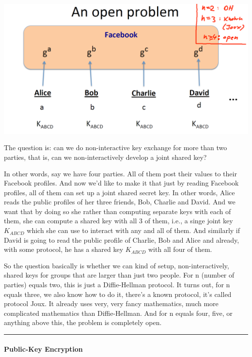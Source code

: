 \documentclass[11pt]{article}
\makeatletter
\def\maxwidth{\ifdim\Gin@nat@width>\linewidth\linewidth
    \else\Gin@nat@width\fi}
\let\Oldincludegraphics\includegraphics
\renewcommand{\includegraphics}[1]{\Oldincludegraphics[width=.8\maxwidth]{#1}}
\makeatother
\begin{document}
\includegraphics{./Images/DH-OpenProb.png}

The question is: can we do non-interactive key exchange for more than
two parties, that is, can we non-interactively develop a joint shared
key?

In other words, say we have four parties. All of them post their values
to their Facebook profiles. And now we'd like to make it that just by
reading Facebook profiles, all of them can set up a joint shared secret
key. In other words, Alice reads the public profiles of her three
friends, Bob, Charlie and David. And we want that by doing so she rather
than computing separate keys with each of them, she can compute a shared
key with all 3 of them, i.e., a singe joint key \(K_{ABCD}\) which she
can use to interact with any and all of them. And similarly if David is
going to read the public profile of Charlie, Bob and Alice and already,
with some protocol, he has a shared key \(K_{ABCD}\) with all four of
them.

So the question basically is whether we can kind of setup,
non-interactively, shared keys for groups that are larger than just two
people. For n (number of parties) equals two, this is just a
Diffie-Hellman protocol. It turns out, for n equals three, we also know
how to do it, there's a known protocol, it's called protocol Joux. It
already uses very, very fancy mathematics, much more complicated
mathematics than Diffie-Hellman. And for n equals four, five, or
anything above this, the problem is completely open.

\begin{center}\rule{0.5\linewidth}{\linethickness}\end{center}

\hypertarget{public-key-encryption}{%
\paragraph{Public-Key Encryption}\label{public-key-encryption}}
\end{document}
